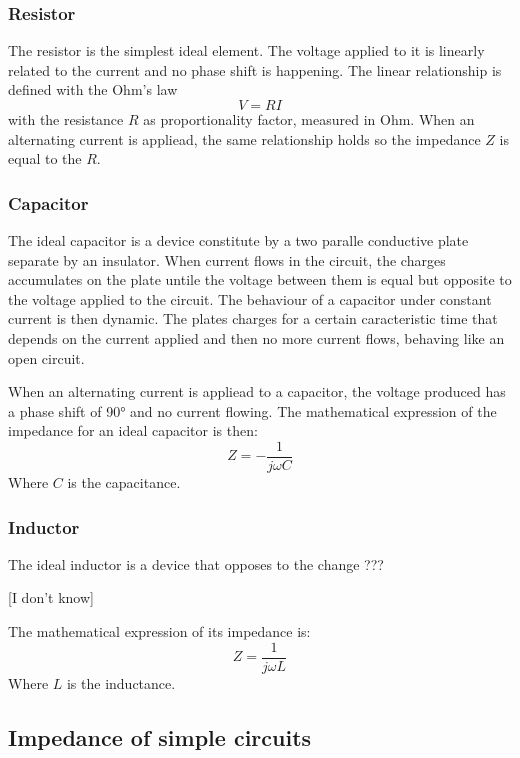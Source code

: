 \subsubsection{Resistor}

The resistor is the simplest ideal element. The voltage applied to it is linearly related to the current and no phase shift is happening. The linear relationship is defined with the Ohm's law
$$
V = R I
$$
with the resistance $R$ as proportionality factor, measured in Ohm. When an alternating current is appliead, the same relationship holds so the impedance $Z$ is equal to the $R$.

\subsubsection{Capacitor}

The ideal capacitor is a device constitute by a two paralle conductive plate separate by an insulator. When current flows in the circuit, the charges accumulates on the plate untile the voltage between them is equal but opposite to the voltage applied to the circuit. The behaviour of a capacitor under constant current is then dynamic. The plates charges for a certain caracteristic time that depends on the current applied and then no more current flows, behaving like an open circuit. 

When an alternating current is appliead to a capacitor, the voltage produced has a phase shift of 90° and no current flowing. The mathematical expression of the impedance for an ideal capacitor is then:
$$
Z = -\frac{1}{j\omega C}
$$
Where $C$ is the capacitance. 

\subsubsection{Inductor}

The ideal inductor is a device that opposes to the change ???

[I don't know]

The mathematical expression of its impedance is:
$$
Z = \frac{1}{j\omega L}
$$
Where $L$ is the inductance.
\subsection{Impedance of simple circuits}

